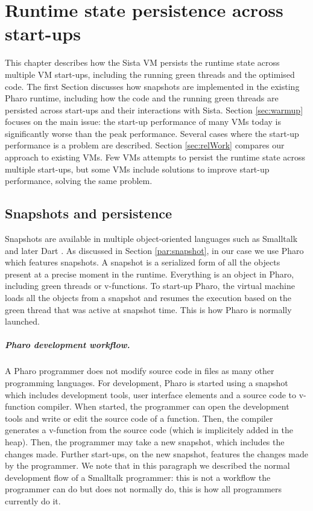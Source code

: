 \documentclass[a4paper,12pt,twoside]{../includes/ThesisStyle}
\begin{document}
\fi

\chapter{Runtime state persistence across start-ups}
\label{chap:persistence}
\minitoc

This chapter describes how the Sista VM persists the runtime state across multiple VM start-ups, including the running green threads and the optimised code. The first Section discusses how snapshots are implemented in the existing Pharo runtime, including how the code and the running green threads are persisted across start-ups and their interactions with Sista. Section \ref{sec:warmup} focuses on the main issue: the start-up performance of many VMs today is significantly worse than the peak performance. Several cases where the start-up performance is a problem are described.  Section \ref{sec:relWork} compares our approach to existing VMs. Few VMs attempts to persist the runtime state across multiple start-ups, but some VMs include solutions to improve start-up performance, solving the same problem.

\section{Snapshots and persistence}

Snapshots are available in multiple object-oriented languages such as Smalltalk \cite{Gold83a} and later Dart \cite{Anna13a}. As discussed in Section \ref{par:snapshot}, in our case we use Pharo which features snapshots. A snapshot is a serialized form of all the objects present at a precise moment in the runtime. Everything is an object in Pharo, including green threads or v-functions. To start-up Pharo, the virtual machine loads all the objects from a snapshot and resumes the execution based on the green thread that was active at snapshot time. This is how Pharo is normally launched.

\paragraph{Pharo development workflow.}A Pharo programmer does not modify source code in files as many other programming languages. For development, Pharo is started using a snapshot which includes development tools, user interface elements and a source code to v-function compiler. When started, the programmer can open the development tools and write or edit the source code of a function. Then, the compiler generates a v-function from the source code (which is implicitely added in the heap). Then, the programmer may take a new snapshot, which includes the changes made. Further start-ups, on the new snapshot, features the changes made by the programmer. We note that in this paragraph we described the normal development flow of a Smalltalk programmer: this is not a workflow the programmer can do but does not normally do, this is how all programmers currently do it.
\end{document}
